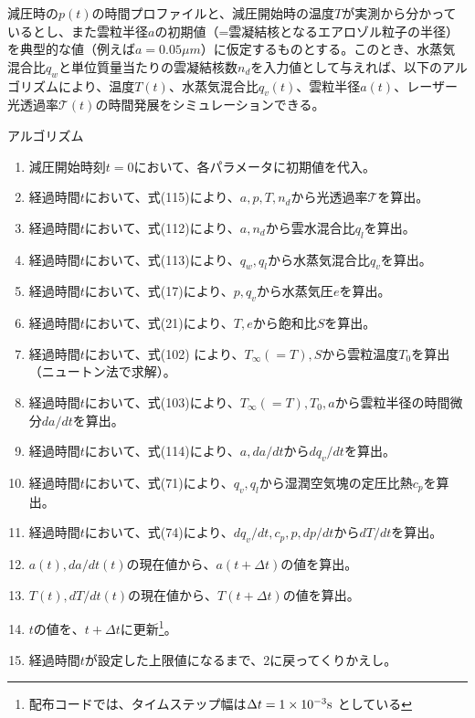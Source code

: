 \documentclass{jsarticle}
\begin{document}
減圧時の$p(t)$の時間プロファイルと、減圧開始時の温度$T$が実測から分かっているとし、また雲粒半径$a$の初期値（=雲凝結核となるエアロゾル粒子の半径）を典型的な値（例えば$a=0.05 \mu m$）に仮定するものとする。このとき、水蒸気混合比$q_{w}$と単位質量当たりの雲凝結核数$n_{d}$を入力値として与えれば、以下のアルゴリズムにより、温度$T(t)$、水蒸気混合比$q_{v}(t)$、雲粒半径$a(t)$、レーザー光透過率$\mathcal{T}(t)$の時間発展をシミュレーションできる。
\\
\begin{itembox}[l]{アルゴリズム}
\begin{enumerate}
\item 減圧開始時刻$t=0$において、各パラメータに初期値を代入。
\item 経過時間$t$において、式(115)により、$a, p, T, n_{d}$から光透過率$\mathcal{T}$を算出。
\item 経過時間$t$において、式(112)により、$a, n_{d}$から雲水混合比$q_{l}$を算出。
\item 経過時間$t$において、式(113)により、$q_{w}, q_{l}$から水蒸気混合比$q_{v}$を算出。
\item 経過時間$t$において、式(17)により、$p, q_{v}$から水蒸気圧$e$を算出。
\item 経過時間$t$において、式(21)により、$T, e$から飽和比$S$を算出。
\item 経過時間$t$において、式(102)	により、$T_{\infty}(=T), S$から雲粒温度$T_{0}$を算出 （ニュートン法で求解）。
\item 経過時間$t$において、式(103)により、$T_{\infty}(=T), T_{0}, a$から雲粒半径の時間微分$da/dt$を算出。
\item 経過時間$t$において、式(114)により、$a, da/dt$から$dq_{v}/dt$を算出。
\item 経過時間$t$において、式(71)により、$q_{v}, q_{l}$から湿潤空気塊の定圧比熱$c_{p}$を算出。
\item 経過時間$t$において、式(74)により、$dq_{v}/dt, c_{p}, p, dp/dt$から$dT/dt$を算出。
\item $a(t), da/dt(t)$の現在値から、$a(t+\Delta t)$の値を算出。
\item $T(t), dT/dt(t)$の現在値から、$T(t+\Delta t)$の値を算出。
\item $t$の値を、$t+\Delta t$に更新\footnote{配布コードでは、タイムステップ幅は$\Delta t=1\times10^{-3}\rm s$ としている}。
\item 経過時間$t$が設定した上限値になるまで、2に戻ってくりかえし。
\end{enumerate}
\end{itembox}
\end{document}
